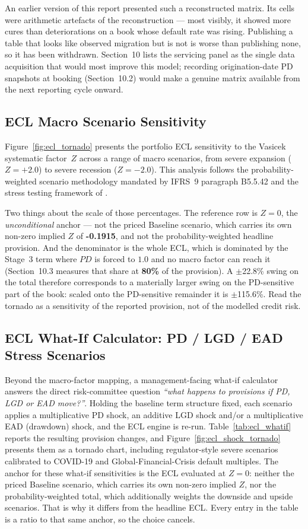 \documentclass[11pt,a4paper]{article}
\begin{document}
An earlier version of this report presented such a reconstructed matrix. Its cells were arithmetic artefacts of the reconstruction --- most visibly, it showed more cures than deteriorations on a book whose default rate was rising. Publishing a table that looks like observed migration but is not is worse than publishing none, so it has been withdrawn. Section~10 lists the servicing panel as the single data acquisition that would most improve this model; recording origination-date PD snapshots at booking (Section~10.2) would make a genuine matrix available from the next reporting cycle onward.

\subsection{ECL Macro Scenario Sensitivity}

Figure~\ref{fig:ecl_tornado} presents the portfolio ECL sensitivity to the Vasicek systematic factor~$Z$ across a range of macro scenarios, from severe expansion ($Z = +2.0$) to severe recession ($Z = -2.0$). This analysis follows the probability-weighted scenario methodology mandated by IFRS~9 paragraph B5.5.42 \parencite{iasb2014} and the stress testing framework of \parencite{bellini2019}.

Two things about the scale of those percentages. The reference row is $Z = 0$, the \emph{unconditional} anchor --- not the priced Baseline scenario, which carries its own non-zero implied $Z$ of \textbf{-0.1915}, and not the probability-weighted headline provision. And the denominator is the whole ECL, which is dominated by the Stage~3 term where $PD$ is forced to $1.0$ and no macro factor can reach it (Section~10.3 measures that share at \textbf{80\%} of the provision). A $\pm$22.8\% swing on the total therefore corresponds to a materially larger swing on the PD-sensitive part of the book: scaled onto the PD-sensitive remainder it is $\pm$115.6\%. Read the tornado as a sensitivity of the reported provision, not of the modelled credit risk.

\subsection{ECL What-If Calculator: PD / LGD / EAD Stress Scenarios}
Beyond the macro-factor mapping, a management-facing what-if calculator answers the direct risk-committee question \emph{``what happens to provisions if PD, LGD or EAD move?''}. Holding the baseline term structure fixed, each scenario applies a multiplicative PD shock, an additive LGD shock and/or a multiplicative EAD (drawdown) shock, and the ECL engine is re-run. Table~\ref{tab:ecl_whatif} reports the resulting provision changes, and Figure~\ref{fig:ecl_shock_tornado} presents them as a tornado chart, including regulator-style severe scenarios calibrated to COVID-19 and Global-Financial-Crisis default multiples. The anchor for these what-if sensitivities is the ECL evaluated at $Z = 0$: neither the priced Baseline scenario, which carries its own non-zero implied $Z$, nor the probability-weighted total, which additionally weights the downside and upside scenarios. That is why it differs from the headline ECL. Every entry in the table is a ratio to that same anchor, so the choice cancels.
\end{document}

